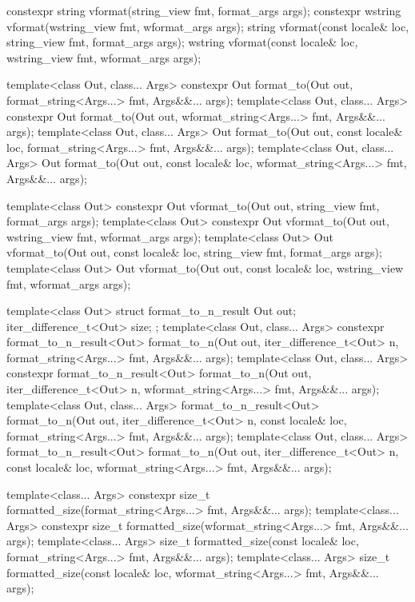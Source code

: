 \begin{codeblock}
{  constexpr string vformat(string_view fmt, format_args args);
  constexpr wstring vformat(wstring_view fmt, wformat_args args);
  string vformat(const locale& loc, string_view fmt, format_args args);
  wstring vformat(const locale& loc, wstring_view fmt, wformat_args args);

  template<class Out, class... Args>
    constexpr Out format_to(Out out, format_string<Args...> fmt, Args&&... args);
  template<class Out, class... Args>
    constexpr Out format_to(Out out, wformat_string<Args...> fmt, Args&&... args);
  template<class Out, class... Args>
    Out format_to(Out out, const locale& loc, format_string<Args...> fmt, Args&&... args);
  template<class Out, class... Args>
    Out format_to(Out out, const locale& loc, wformat_string<Args...> fmt, Args&&... args);

  template<class Out>
    constexpr Out vformat_to(Out out, string_view fmt, format_args args);
  template<class Out>
    constexpr Out vformat_to(Out out, wstring_view fmt, wformat_args args);
  template<class Out>
    Out vformat_to(Out out, const locale& loc, string_view fmt, format_args args);
  template<class Out>
    Out vformat_to(Out out, const locale& loc, wstring_view fmt, wformat_args args);

  template<class Out> struct format_to_n_result {
    Out out;
    iter_difference_t<Out> size;
  };
  template<class Out, class... Args>
    constexpr format_to_n_result<Out> format_to_n(Out out, iter_difference_t<Out> n,
                                                  format_string<Args...> fmt,
                                                  Args&&... args);
  template<class Out, class... Args>
    constexpr format_to_n_result<Out> format_to_n(Out out, iter_difference_t<Out> n,
                                                  wformat_string<Args...> fmt,
                                                  Args&&... args);
  template<class Out, class... Args>
    format_to_n_result<Out> format_to_n(Out out, iter_difference_t<Out> n,
                                        const locale& loc, format_string<Args...> fmt,
                                        Args&&... args);
  template<class Out, class... Args>
    format_to_n_result<Out> format_to_n(Out out, iter_difference_t<Out> n,
                                        const locale& loc, wformat_string<Args...> fmt,
                                        Args&&... args);

  template<class... Args>
    constexpr size_t formatted_size(format_string<Args...> fmt, Args&&... args);
  template<class... Args>
    constexpr size_t formatted_size(wformat_string<Args...> fmt, Args&&... args);
  template<class... Args>
    size_t formatted_size(const locale& loc, format_string<Args...> fmt, Args&&... args);
  template<class... Args>
    size_t formatted_size(const locale& loc, wformat_string<Args...> fmt, Args&&... args);

}
\end{codeblock}
